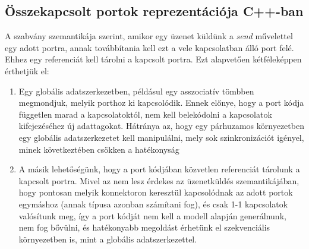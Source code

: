 \documentclass[a4paper,12pt]{report}
\begin{document}
\subsection{Összekapcsolt portok reprezentációja C++-ban} \label{conn_cpp}
A szabvány szemantikája szerint, amikor egy üzenet küldünk a \textit{send} művelettel egy adott portra, annak továbbítania kell ezt a vele kapcsolatban álló port felé. Ehhez egy referenciát kell tárolni a kapcsolt portra. Ezt alapvetően kétféleképpen érthetjük el:\\
\begin{enumerate}
\item Egy globális adatszerkezetben, példásul egy asszociatív tömbben megmondjuk, melyik porthoz ki kapcsolódik. Ennek előnye, hogy a port kódja független marad a kapcsolatoktól, nem kell belekódolni a kapcsolatok kifejezéséhez új adattagokat.
Hátránya az, hogy egy párhuzamos környezetben egy globális adatszerkezetet kell manipulálni, mely sok szinkronizációt igényel, minek következtében csökken a hatékonyság
\item A másik lehetőségünk, hogy a port kódjában közvetlen referenciát tárolunk a kapcsolt portra. Mivel az nem lesz érdekes az üzenetküldés szemantikájában, hogy pontosan melyik konnektoron keresztül kapcsolódnak az adott portok egymáshoz (annak típusa azonban számítani fog), és csak 1-1 kapcsolatok valósítunk meg, így a port kódját nem kell a modell alapján generálnunk, nem fog bővülni, és hatékonyabb megoldást érhetünk el szekvenciális környezetben is, mint a globális adatszerkezettel. 
\end{enumerate}
\end{document}
